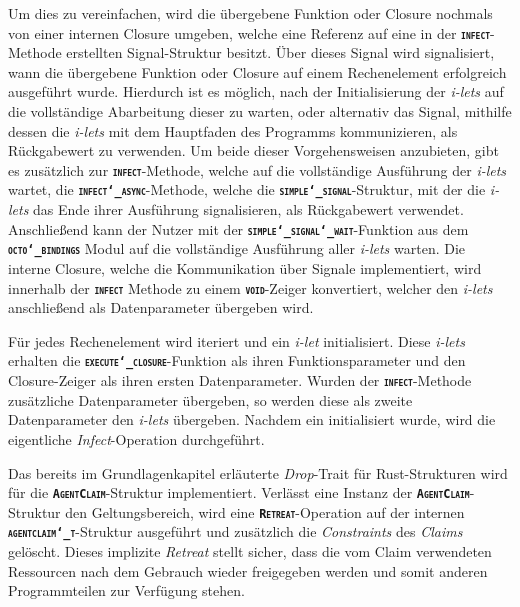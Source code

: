 Um dies zu vereinfachen, wird die übergebene Funktion oder Closure nochmals von einer internen Closure umgeben,
welche eine Referenz auf eine in der \texttt{\textsc{\textbf{infect}}}-Methode erstellten Signal-Struktur besitzt.
Über dieses Signal wird signalisiert, wann die übergebene Funktion oder Closure auf einem Rechenelement erfolgreich
ausgeführt wurde.
Hierdurch ist es möglich, nach der Initialisierung der \textit{i-lets} auf die
vollständige Abarbeitung dieser zu warten, oder alternativ das Signal, mithilfe dessen die \textit{i-lets} mit dem
Hauptfaden des Programms kommunizieren, als Rückgabewert zu verwenden.
Um beide dieser Vorgehensweisen anzubieten, gibt es zusätzlich zur \texttt{\textsc{\textbf{infect}}}-Methode,
welche auf die vollständige Ausführung der \textit{i-lets} wartet,
die \texttt{\textsc{\textbf{infect\char`_async}}}-Methode,
welche die \texttt{\textsc{\textbf{simple\char`_signal}}}-Struktur,
mit der die \textit{i-lets} das Ende ihrer Ausführung signalisieren,
als Rückgabewert verwendet. Anschließend kann der Nutzer mit der 
\texttt{\textsc{\textbf{simple\char`_signal\char`_wait}}}-Funktion aus dem
\texttt{\textsc{\textbf{octo\char`_bindings}}}
Modul auf die vollständige Ausführung aller \textit{i-lets} warten.
Die interne Closure, welche die Kommunikation über Signale implementiert, wird innerhalb der
\texttt{\textsc{\textbf{infect}}} Methode zu einem \texttt{\textsc{\textbf{void}}}-Zeiger konvertiert,
welcher den \textit{i-lets} anschließend als Datenparameter übergeben wird.

Für jedes Rechenelement wird iteriert und ein \textit{i-let} initialisiert.
Diese \textit{i-lets} erhalten die \texttt{\textsc{\textbf{execute\char`_closure}}}-Funktion als ihren
Funktionsparameter und den Closure-Zeiger als ihren ersten Datenparameter.
Wurden der \texttt{\textsc{\textbf{infect}}}-Methode zusätzliche Datenparameter
übergeben, so werden diese als zweite Datenparameter den \textit{i-lets} übergeben.
Nachdem ein  initialisiert wurde, wird die eigentliche \textit{Infect}-Operation durchgeführt.

Das bereits im Grundlagenkapitel erläuterte \textit{Drop}-Trait für Rust-Strukturen wird für die
\texttt{\textsc{\textbf{AgentClaim}}}-Struktur implementiert.
Verlässt eine Instanz der \texttt{\textsc{\textbf{AgentClaim}}}-Struktur den Geltungsbereich, wird eine
\texttt{\textsc{\textbf{Retreat}}}-Operation auf der internen \\
\texttt{\textsc{\textbf{agentclaim\char`_t}}}-Struktur ausgeführt und zusätzlich
die \textit{Constraints} des \textit{Claims} gelöscht. Dieses implizite \textit{Retreat}
stellt sicher, dass die vom Claim verwendeten Ressourcen nach dem Gebrauch wieder freigegeben werden und
somit anderen Programmteilen zur Verfügung stehen.
